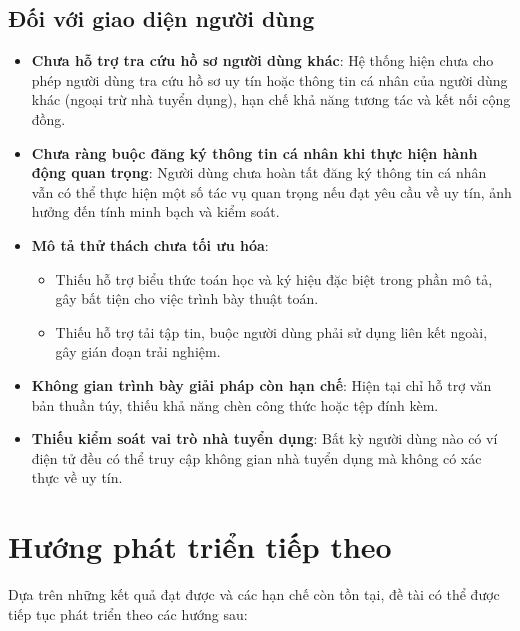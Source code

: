 \subsection{Đối với giao diện người dùng}
\begin{itemize}
  \item \textbf{Chưa hỗ trợ tra cứu hồ sơ người dùng khác}: Hệ thống hiện chưa cho phép người dùng tra cứu hồ sơ uy tín hoặc thông tin cá nhân của người dùng khác (ngoại trừ nhà tuyển dụng), hạn chế khả năng tương tác và kết nối cộng đồng.
  \item \textbf{Chưa ràng buộc đăng ký thông tin cá nhân khi thực hiện hành động quan trọng}: Người dùng chưa hoàn tất đăng ký thông tin cá nhân vẫn có thể thực hiện một số tác vụ quan trọng nếu đạt yêu cầu về uy tín, ảnh hưởng đến tính minh bạch và kiểm soát.
  \item \textbf{Mô tả thử thách chưa tối ưu hóa}:
        \begin{itemize}
          \item Thiếu hỗ trợ biểu thức toán học và ký hiệu đặc biệt trong phần mô tả, gây bất tiện cho việc trình bày thuật toán.
          \item Thiếu hỗ trợ tải tập tin, buộc người dùng phải sử dụng liên kết ngoài, gây gián đoạn trải nghiệm.
        \end{itemize}
  \item \textbf{Không gian trình bày giải pháp còn hạn chế}: Hiện tại chỉ hỗ trợ văn bản thuần túy, thiếu khả năng chèn công thức hoặc tệp đính kèm.
  \item \textbf{Thiếu kiểm soát vai trò nhà tuyển dụng}: Bất kỳ người dùng nào có ví điện tử đều có thể truy cập không gian nhà tuyển dụng mà không có xác thực về uy tín.
\end{itemize}

\section{Hướng phát triển tiếp theo}

Dựa trên những kết quả đạt được và các hạn chế còn tồn tại, đề tài có thể được tiếp tục phát triển theo các hướng sau:

